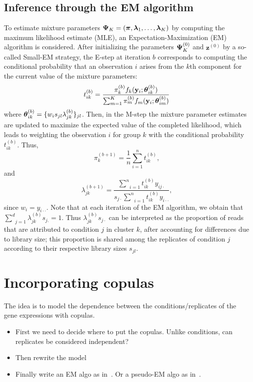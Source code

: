\documentclass[10pt,oneside]{article}
\newcommand\bfm[1]{\ensuremath\boldsymbol{#1}}
\newcommand\y{\mathbf{y}}
\newcommand\z{\mathbf{z}}
\newcommand\PSI{\bfm{\Psi}}
\newcommand\LAMBDA{\bfm{\lambda}}
\newcommand\THETA{\bfm{\theta}}
\newcommand\PI{\bfm{\pi}}
\renewcommand{\b}{{(b)}}
\newcommand{\bb}{{(b+1)}}
\begin{document}
\subsection{Inference through the EM algorithm}
To estimate mixture parameters $\PSI_K=(\PI, \LAMBDA_1, \ldots, \LAMBDA_K)$ by computing the maximum likelihood estimate (MLE), an Expectation-Maximization (EM) algorithm is considered. 
After initializing the parameters $\PSI^{(0)}_K$ and $\z^{(0)}$ by a so-called Small-EM strategy, the E-step at iteration $b$ corresponds to computing the conditional probability that an observation $i$ arises from the $k{\mathrm{th}}$ component for the current value of the mixture parameters:
\begin{equation}
t_{ik}^{(b)} = \frac{\pi_k^\b f_k(\y_i; \THETA_{ik}^\b)}{\sum_{m=1}^K\pi_m^\b f_m(\y_i; \THETA_{im}^\b)} \nonumber
\end{equation}
where $\THETA_{ik}^{(b)} = \{ w_i s_{jl} \lambda_{jk}^{(b)} \}_{jl}$.       
Then, in the M-step the mixture parameter estimates are updated to maximize the expected value of the completed likelihood, which leads to weighting the observation $i$ for group $k$ with the conditional probability $t_{ik}^{(b)}$. 
Thus, 
\begin{equation}
\pi_k^\bb = \frac{1}{n} \sum_{i=1}^n t_{ik}^\b,
\end{equation}
and
\begin{equation}
\lambda_{jk}^\bb = \frac{\underset{i=1}{\stackrel{n}{\sum}} t_{ik}^\b y_{ij\cdot}}{s_{j\cdot} \underset{i=1}{\stackrel{n}{\sum}} t_{ik}^\b y_{i\cdot\cdot}}, \nonumber
\end{equation}
since $w_i=y_{i\cdot\cdot}$.
Note that at each iteration of the EM algorithm, we obtain that $\underset{j=1}{\stackrel{d}{\sum}} \lambda_{jk}^{(b)} s_{j.} =1$.
Thus $\lambda_{jk}^{(b)} s_{j\cdot}$ can be interpreted as the proportion of reads that are attributed to condition $j$ in cluster $k$, after accounting for differences due to library size; this proportion is shared among the replicates of condition $j$ according to their respective library sizes $s_{jl}$.

\section{Incorporating copulas}

The idea is to model the dependence between the conditions/replicates of the gene expressions with copulas. 

\begin{itemize}
\item First we need to decide where to put the copulas. Unlike conditions, can replicates be considered independent? 
\item Then rewrite the model
\item Finally write an EM algo as in~\cite{kosmidis2016model,nikoloulopoulos2009modeling}. Or a pseudo-EM algo as in~\cite{mazo2017semiparametric}.
\end{itemize}
\end{document}

